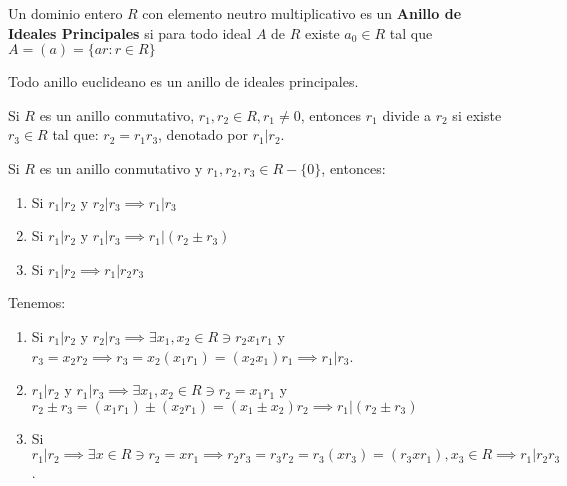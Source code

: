\begin{definicion}
    Un dominio entero $R$ con elemento neutro multiplicativo es un \textbf{Anillo de Ideales Principales} si para todo ideal $A$ de $R$ existe $a_0\in R$ tal que $A=(a)=\{ar:r\in R\}$  
\end{definicion}

\begin{corolario}
    Todo anillo euclideano es un anillo de ideales principales. 
\end{corolario}


\begin{definicion}
    Si $R$ es un anillo conmutativo, $r_1,r_2\in R, r_1\neq 0$, entonces $r_1$ divide a $r_2$ si existe $r_3\in R$ tal que: $r_2=r_1r_3$, denotado por $r_1|r_2$. 
\end{definicion}

\begin{prop}
    Si $R$ es un anillo conmutativo y $r_1,r_2,r_3\in R-\{0\}$, entonces: 
    \begin{enumerate}
        \item Si $r_1|r_2$ y $r_2|r_3\implies r_1|r_3$
        \item Si $r_1|r_2$ y $r_1|r_3\implies r_1|(r_2\pm r_3)$
        \item Si $r_1|r_2\implies r_1|r_2r_3$ 
    \end{enumerate}
    \begin{dem}
        Tenemos: 
        \begin{enumerate}
            \item Si $r_1|r_2$ y $r_2|r_3\implies \exists x_1,x_2\in R\ni r_2x_1r_1$ y $r_3=x_2r_2\implies r_3=x_2(x_1r_1)=(x_2x_1)r_1\implies r_1|r_3$. 
            \item $r_1|r_2$ y $r_1|r_3\implies \exists x_1,x_2\in R\ni r_2=x_1r_1$ y $r_2\pm r_3 =(x_1r_1)\pm (x_2r_1)=(x_1\pm x_2)r_2\implies r_1|(r_2\pm r_3)$
            \item Si $r_1|r_2\implies \exists x\in R\ni r_2=xr_1\implies r_2r_3=r_3r_2=r_3(xr_3)=(r_3xr_1),x_3\in R\implies r_1|r_2r_3$.
        \end{enumerate}
    \end{dem}
\end{prop}